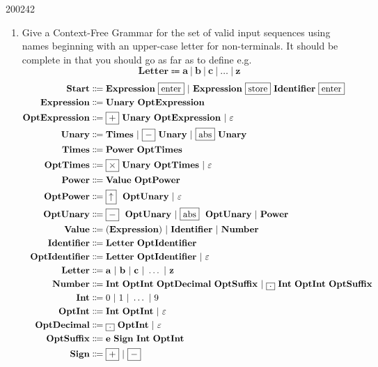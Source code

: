 \documentclass[10pt,\jkfside,a4paper]{article}
\begin{document}
\begin{examquestion}{2002}{4}{2}
\begin{enumerate}
\item Give a Context-Free Grammar for the set of valid input sequences using
names beginning with an upper-case letter for non-terminals. It should be
complete in that you should go as far as to define e.g.
\[
\mathbf{Letter} \Coloneqq \mathbf{a} \ | \ \mathbf{b} \ | \ \mathbf{c} \ |
\ \dots \ | \ \mathbf{z}
\]
\begin{align*}
\Start &\Coloneqq \Expression \ \framebox{enter} \ | \ \Expression \
\framebox{store} \ \Identifier \ \framebox{enter} \\
\Expression &\Coloneqq \Unary \ \OptExpression \\
\OptExpression &\Coloneqq \framebox{$+$} \ \Unary \ \OptExpression \ | \
\varepsilon \\
\Unary &\Coloneqq \Times \ | \ \framebox{$-$} \ \Unary \ | \ \framebox{abs} \
\Unary \\
\Times &\Coloneqq \Arrow \ \OptTimes \\
\OptTimes &\Coloneqq \framebox{$\times$} \ \Unary \ \OptTimes \ | \
\varepsilon\\
\Arrow &\Coloneqq \Value \ \OptArrow \\
\OptArrow &\Coloneqq \framebox{$\uparrow$} \ \OptUnary \ | \ \varepsilon \\
\OptUnary &\Coloneq \framebox{$-$} \ \OptUnary \ | \ \framebox{abs} \
\OptUnary \ | \ \Arrow \\
\Value &\Coloneqq (\Expression) \ | \ \Identifier \ | \ \Number \\
\Identifier &\Coloneqq \Letter \ \OptIdentifier \\
\OptIdentifier &\Coloneqq \Letter \ \OptIdentifier \ | \ \varepsilon \\
\Letter &\Coloneqq \mathbf{a} \ | \ \mathbf{b} \ | \ \mathbf{c} \ | \ \dots \
 | \ \mathbf{z} \\
\Number &\Coloneqq \Int \ \OptInt \ \OptDecimal \ \OptSuffix \ | \
\framebox{$.$} \ \Int \ \OptInt \ \OptSuffix \\
\Int &\Coloneqq 0 \ | \ 1 \ | \ \dots \ | \ 9 \\
\OptInt &\Coloneqq \Int \ \OptInt \ | \ \varepsilon \\
\OptDecimal &\Coloneqq \framebox{$.$} \ \OptInt \ | \ \varepsilon \\
\OptSuffix &\Coloneqq \mathbf{e} \ \Sign \ \Int \ \OptInt \\
\Sign &\Coloneqq \framebox{$+$} \ | \ \framebox{$-$} \\
\end{align*}


\end{enumerate}
\end{examquestion}
\end{document}
